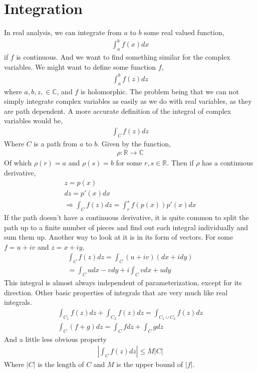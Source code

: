 \documentclass{article}
\begin{document}
\section{Integration}
In real analysis, we can integrate from $a$ to $b$ some real valued function,
\begin{gather*}
	\int_{a}^{b} f(x) dx
\end{gather*}
if $f$ is continuous. And we want to find something similar for the complex variables. We might
want to define some function $f$,
\begin{gather*}
	\int_{a}^{b} f(z) dz
\end{gather*}
where $a, b, z, \in \mathbb{C}$, and $f$ is holomorphic. The problem being that we can not simply
integrate complex variables as easily as we do with real variables, as they are path dependent. A
more accurate definition of the integral of complex variables would be,
\begin{gather*}
	\int_{C}f(z)dz
\end{gather*}
Where $C$ is a path from $a$ to $b$. Given by the function,
\begin{gather*}
	\rho : \mathbb{R} \rightarrow \mathbb{C}
\end{gather*}
Of which $\rho(r) = a$ and $ \rho(s) = b$ for some $r, s \in \mathbb{R}$. Then if $\rho$ has a continuous
derivative,
\begin{gather*}
	z = p(x) \\
	dz = p'(x)dx \\
	\Rightarrow \int_{C}f(z)dz = \int_r^s f(p(x))p'(x)dx
\end{gather*}
If the path doesn't have a continuous derivative, it is quite common to split the path up to a finite number of
pieces and find out each integral individually and sum them up. Another way to look at it is in its form of vectors.
For some $f = u + iv$ and $z = x + iy$,
\begin{gather*}
	\int_C f(z)dz = \int_C (u + iv) (dx + idy) \\
	= \int_C udx - vdy + i \int_C vdx + udy
\end{gather*}
This integral is almost always independent of parameterization, except for its direction. Other basic properties
of integrals that are very much like real integrals.
\begin{gather*}
	\int_{C_1} f(z)dz + \int_{C_2} f(z)dz = \int_{C_1 \cup C_2} f(z)dz \\
	\int_C (f + g) dz = \int_C f dz + \int_C g dz
\end{gather*}
And a little less obvious property
\begin{gather*}
	|\int_C f(z) dz | \leq M|C|
\end{gather*}
Where $|C|$ is the length of $C$ and $M$ is the upper bound of $|f|$.
\end{document}
